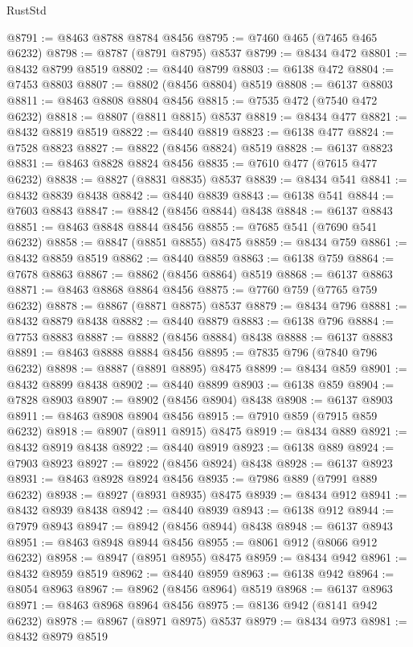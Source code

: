 \begin{lexlean}{RustStd}
\begin{coremodule}
{{@8791 := @8463 @8788 @8784 @8456
@8795 := @7460 @465 (@7465 @465 @6232)
@8798 := @8787 (@8791 @8795) @8537
@8799 := @8434 @472
@8801 := @8432 @8799 @8519
@8802 := @8440 @8799
@8803 := @6138 @472
@8804 := @7453 @8803
@8807 := @8802 (@8456 @8804) @8519
@8808 := @6137 @8803
@8811 := @8463 @8808 @8804 @8456
@8815 := @7535 @472 (@7540 @472 @6232)
@8818 := @8807 (@8811 @8815) @8537
@8819 := @8434 @477
@8821 := @8432 @8819 @8519
@8822 := @8440 @8819
@8823 := @6138 @477
@8824 := @7528 @8823
@8827 := @8822 (@8456 @8824) @8519
@8828 := @6137 @8823
@8831 := @8463 @8828 @8824 @8456
@8835 := @7610 @477 (@7615 @477 @6232)
@8838 := @8827 (@8831 @8835) @8537
@8839 := @8434 @541
@8841 := @8432 @8839 @8438
@8842 := @8440 @8839
@8843 := @6138 @541
@8844 := @7603 @8843
@8847 := @8842 (@8456 @8844) @8438
@8848 := @6137 @8843
@8851 := @8463 @8848 @8844 @8456
@8855 := @7685 @541 (@7690 @541 @6232)
@8858 := @8847 (@8851 @8855) @8475
@8859 := @8434 @759
@8861 := @8432 @8859 @8519
@8862 := @8440 @8859
@8863 := @6138 @759
@8864 := @7678 @8863
@8867 := @8862 (@8456 @8864) @8519
@8868 := @6137 @8863
@8871 := @8463 @8868 @8864 @8456
@8875 := @7760 @759 (@7765 @759 @6232)
@8878 := @8867 (@8871 @8875) @8537
@8879 := @8434 @796
@8881 := @8432 @8879 @8438
@8882 := @8440 @8879
@8883 := @6138 @796
@8884 := @7753 @8883
@8887 := @8882 (@8456 @8884) @8438
@8888 := @6137 @8883
@8891 := @8463 @8888 @8884 @8456
@8895 := @7835 @796 (@7840 @796 @6232)
@8898 := @8887 (@8891 @8895) @8475
@8899 := @8434 @859
@8901 := @8432 @8899 @8438
@8902 := @8440 @8899
@8903 := @6138 @859
@8904 := @7828 @8903
@8907 := @8902 (@8456 @8904) @8438
@8908 := @6137 @8903
@8911 := @8463 @8908 @8904 @8456
@8915 := @7910 @859 (@7915 @859 @6232)
@8918 := @8907 (@8911 @8915) @8475
@8919 := @8434 @889
@8921 := @8432 @8919 @8438
@8922 := @8440 @8919
@8923 := @6138 @889
@8924 := @7903 @8923
@8927 := @8922 (@8456 @8924) @8438
@8928 := @6137 @8923
@8931 := @8463 @8928 @8924 @8456
@8935 := @7986 @889 (@7991 @889 @6232)
@8938 := @8927 (@8931 @8935) @8475
@8939 := @8434 @912
@8941 := @8432 @8939 @8438
@8942 := @8440 @8939
@8943 := @6138 @912
@8944 := @7979 @8943
@8947 := @8942 (@8456 @8944) @8438
@8948 := @6137 @8943
@8951 := @8463 @8948 @8944 @8456
@8955 := @8061 @912 (@8066 @912 @6232)
@8958 := @8947 (@8951 @8955) @8475
@8959 := @8434 @942
@8961 := @8432 @8959 @8519
@8962 := @8440 @8959
@8963 := @6138 @942
@8964 := @8054 @8963
@8967 := @8962 (@8456 @8964) @8519
@8968 := @6137 @8963
@8971 := @8463 @8968 @8964 @8456
@8975 := @8136 @942 (@8141 @942 @6232)
@8978 := @8967 (@8971 @8975) @8537
@8979 := @8434 @973
@8981 := @8432 @8979 @8519
}}
\end{coremodule}
\end{lexlean}
